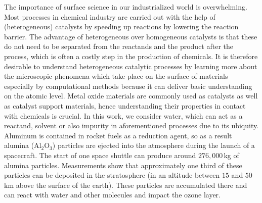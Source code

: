 \documentclass[11pt,DIV=13,BCOR=5mm,a4paper,headinclude]{scrbook}
\begin{document}
The importance of surface science in our industrialized world is overwhelming.
Most processes in chemical industry are carried out with the help of (heterogeneous) catalysts\cite{Ago2005,Cargnello2012,Knozinger1978} by speeding up reactions by lowering the reaction barrier.
The advantage of heterogeneous over homogeneous catalysts is that these do not need to be separated from the reactands and the product after the process, which is often a costly step in the production of chemicals.
It is therefore desirable to understand heterogeneous catalytic processes by learning more about the microscopic phenomena which take place on the surface of materials especially by computational methods because it can deliver basic understanding on the atomic level.
Metal oxide materials are commonly used as catalysts as well as catalyst support materials, hence understanding their properties in contact with chemicals is crucial.
In this work, we consider water, which can act as a reactand, solvent or also impurity in aforementioned processes due to its ubiquity.
\\

Aluminum is contained in rocket fuels as a reduction agent, so as a result alumina (Al$_2$O$_3$) particles are ejected into the atmosphere during the launch of a spacecraft\cite{Elam1998}.
The start of one space shuttle can produce around $276,000\,$kg of alumina particles\cite{Potter1978}.
Measurements show that approximately one third of these particles can be deposited in the stratosphere\cite{Cofer1978} (in an altitude between $15$ and $50\,$km above the surface of the earth).
These particles are accumulated there and can react with water and other molecules\cite{Jones1995,Jackman1996} and impact the ozone layer.
\\
\end{document}
